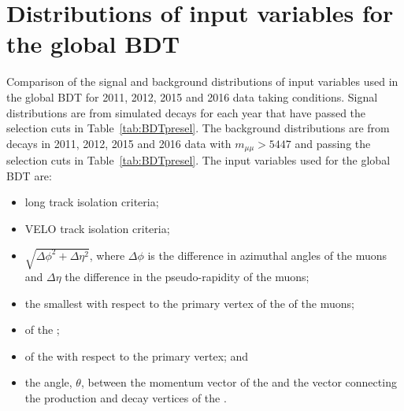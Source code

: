 \chapter{{\bf Distributions of input variables for the global BDT}}
\label{sec:appendix1}
Comparison of the signal and background distributions of input variables used in the global BDT for 2011, 2012, 2015 and 2016 data taking conditions. Signal distributions are from simulated \bsmumu decays for each year that have passed the selection cuts in Table~\ref{tab:BDTpresel}. The background distributions are from \bbbarmumux decays in 2011, 2012, 2015 and 2016 data with $m_{\mu \mu} > 5447$ \mevcc and passing the selection cuts in Table~\ref{tab:BDTpresel}.
The input variables used for the global BDT are:
\begin{itemize}
\item long track isolation criteria;
\item VELO track isolation criteria;
\item $\sqrt{\Delta \phi^{2} + \Delta \eta^{2}}$, where $\Delta \phi$ is the difference in azimuthal angles of the muons and $\Delta \eta$ the difference in the pseudo-rapidity of the muons;
\item the smallest \chiIP with respect to the primary vertex of the \bsmumu of the muons;
\item \chivtx of the \bs;
\item \chiIP of the \bs with respect to the primary vertex; and
\item the angle, $\theta$, between the momentum vector of the \bs and the vector connecting the production and decay vertices of the \bs.
\end{itemize}


